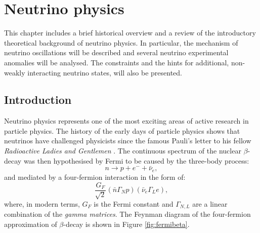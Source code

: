 

\chapter{\label{ch:2-neutrinophysics}Neutrino physics}

\minitoc

This chapter includes a brief historical overview and a review of the introductory theoretical background of neutrino physics. In particular, the mechanism of neutrino oscillations will be described and several neutrino experimental anomalies will be analysed. The constraints and the hints for additional, non-weakly interacting neutrino states, will also be presented.

\section{Introduction}

Neutrino physics represents one of the most exciting areas of active research in particle physics. The history of the early days of particle physics shows that neutrinos have challenged physicists since the famous Pauli's letter to his fellow \emph{Radioactive Ladies and Gentlemen} \cite{Pauli:1930pc}. The continuous spectrum of the nuclear $\beta$-decay was then hypothesised by Fermi to be caused by the three-body process:
\begin{equation}
    n\rightarrow p + e^{-} + \bar{\nu}_{e},
\end{equation}
and mediated by a four-fermion interaction in the form of:
\begin{equation}
    \frac{G_{F}}{\sqrt{2}}(\bar{n}\Gamma_{N}p)(\bar{\nu}_{e}\Gamma_{L}e),
\end{equation}
where, in modern terms, $G_{F}$ is the Fermi constant and $\Gamma_{N,L}$ are a linear combination of the \emph{gamma matrices}. The Feynman diagram of the four-fermion approximation of $\beta$-decay is shown in Figure \ref{fig:fermibeta}.


